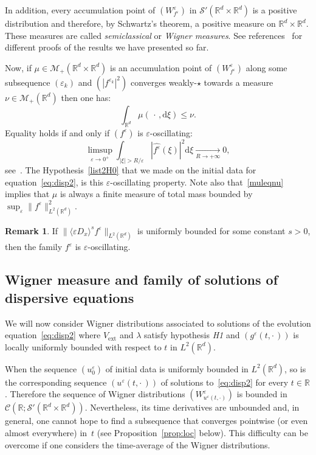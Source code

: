 \documentclass[10pt]{amsart}
\theoremstyle{definition}
\newtheorem{rema}[cdrthm]{Remark}
\DeclareMathOperator{\ext}{ext}
\newcommand*\R{{\mathbb R}}
\newcommand*\eps{\varepsilon}
\numberwithin{equation}{section}
\def\Tend#1#2{\mathop{\longrightarrow}\limits_{#1\rightarrow#2}}
\newcommand*{\dd}{\mathrm{d}}
\newcommand*{\dxi}{\dd \xi}
\begin{document}

In addition, every accumulation point of $(W^\eps_{f^\eps})$ in $\mathcal{S}'(\R^d\times\R^d)$ is a positive distribution and therefore, by Schwartz's theorem, a positive measure on $\R^d\times\R^d$. These measures are called \emph{semiclassical} or \emph{Wigner measures}. See references~\cite{Ge91,GerLeich93,GMMP,LionsPaul} for different proofs of the results we have presented so far.


Now, if $\mu\in\mathcal{M}_+(\R^d\times\R^d)$ is an accumulation point of $(W^\eps_{f^\eps})$ along some subsequence $(\eps_k)$ and $(|f^{\eps_k}|^2)$ converges weakly-$\star$ towards a measure $\nu\in\mathcal{M}_+(\R^d)$ then one has:
\begin{equation}\label{muleqnu}
\int_{\R^d}\mu(\,\cdot\,,\dxi)\leq \nu.
\end{equation}
Equality holds if and only if $(f^\eps)$ is $\eps$-oscillating:
\begin{equation}\label{def:xoscclassical}
\limsup_{\eps\rightarrow 0^+}\int_{|\xi|>R/\eps} | \widehat{f^\eps} (\xi)| ^2 \dxi \Tend{R}{+\infty} 0,
\end{equation}
see~\cite{Ge91,GerLeich93,GMMP}. The Hypothesis~\eqref{list2H0} that we made on the initial data for equation~\eqref{eq:disp2}, is this $\eps$-oscillating property. Note also that~\eqref{muleqnu} implies that $\mu$ is always a finite measure of total mass bounded by $\sup_\eps \|f^\eps\|^2_{L^2(\R^d)}$.

\begin{rema}\label{rem:Hsepsosc}
If $\|\langle \eps D_x\rangle^s f^\eps\|_{L^2(\R^d)}$ is uniformly bounded for some constant $s>0$, then the family $f^\eps$ is $\eps$-oscillating.
\end{rema}



\subsection{Wigner measure and family of solutions of dispersive equations}

We will now consider Wigner distributions associated to solutions of the evolution equation~\eqref{eq:disp2} where $V_{\ext}$ and $\lambda$ satisfy hypothesis \emph{H1} and $(g^\eps(t,\cdot\,))$ is locally uniformly bounded with respect to $t$ in $L^2(\R^d)$.



When the sequence $(u^\eps_0)$ of initial data is uniformly bounded in $L^2(\R^d)$, so is the corresponding sequence $(u^\eps(t,\cdot\,))$ of solutions to~\eqref{eq:disp2} for every $t\in\R$. Therefore the sequence of Wigner distributions $(W^\eps_{u^\eps(t,\cdot)})$ is bounded in $\mathcal{C}(\R;\mathcal{S}'(\R^d\times\R^d))$. Nevertheless, its time derivatives are unbounded and, in general, one cannot hope to find a subsequence that converges pointwise (or even almost everywhere) in~$t$ (see Proposition~\ref{prop:loc} below). This difficulty can be overcome if one considers the time-average of the Wigner distributions.
\end{document}
